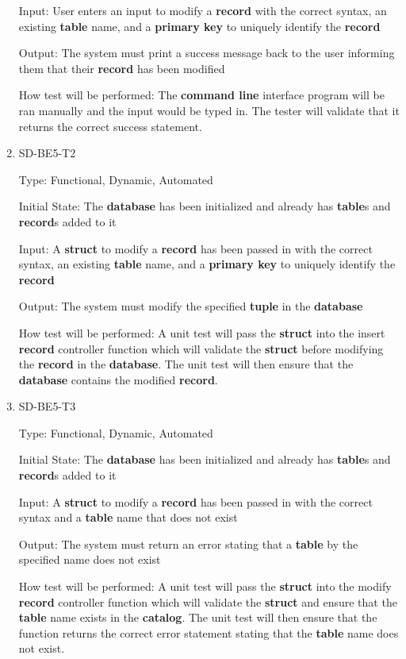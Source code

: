 \documentclass[12pt, titlepage]{article}
\begin{document}
\begin{enumerate}
Input: User enters an input to modify a \textbf{record} with the correct syntax, an existing \textbf{table} name, and a \textbf{primary key} to uniquely identify the \textbf{record}
					
Output: The system must print a success message back to the user informing them that their \textbf{record} has been modified
					
How test will be performed: The \textbf{command line} interface program will be ran manually and the input would be typed in. The tester will validate that it returns the correct success statement.

\item{SD-BE5-T2}

Type: Functional, Dynamic, Automated
					
Initial State: The \textbf{database} has been initialized and already has \textbf{table}s and \textbf{record}s added to it
					
Input: A \textbf{struct} to modify a \textbf{record} has been passed in with the correct syntax, an existing \textbf{table} name, and a \textbf{primary key} to uniquely identify the \textbf{record}
					
Output: The system must modify the specified \textbf{tuple} in the \textbf{database}
					
How test will be performed: A unit test will pass the \textbf{struct} into the insert \textbf{record} controller function which will validate the \textbf{struct} before modifying the \textbf{record} in the \textbf{database}. The unit test will then ensure that the \textbf{database} contains the modified \textbf{record}.

\item{SD-BE5-T3}

Type: Functional, Dynamic, Automated
					
Initial State: The \textbf{database} has been initialized and already has \textbf{table}s and \textbf{record}s added to it
					
Input: A \textbf{struct} to modify a \textbf{record} has been passed in with the correct syntax and a \textbf{table} name that does not exist
					
Output: The system must return an error stating that a \textbf{table} by the specified name does not exist
					
How test will be performed: A unit test will pass the \textbf{struct} into the modify \textbf{record} controller function which will validate the \textbf{struct} and ensure that the \textbf{table} name exists in the \textbf{catalog}. The unit test will then ensure that the function returns the correct error statement stating that the \textbf{table} name does not exist.


\end{enumerate}
\end{document}
